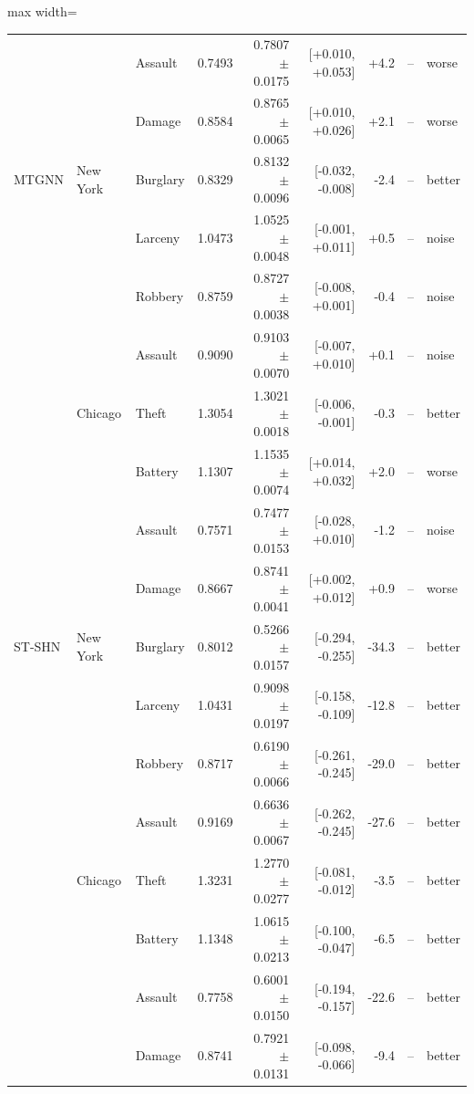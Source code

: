 \begin{table}[H]
\begin{adjustbox}{max width=\linewidth}
\begin{tabular}{lllrrrrrl}
 &  & Assault & 0.7493 & 0.7807 $\pm$ 0.0175 & [+0.010, +0.053] & +4.2 & -- & worse \\
 &  & Damage & 0.8584 & 0.8765 $\pm$ 0.0065 & [+0.010, +0.026] & +2.1 & -- & worse \\
\midrule
MTGNN & New York & Burglary & 0.8329 & 0.8132 $\pm$ 0.0096 & [-0.032, -0.008] & -2.4 & -- & better \\
 &  & Larceny & 1.0473 & 1.0525 $\pm$ 0.0048 & [-0.001, +0.011] & +0.5 & -- & noise \\
 &  & Robbery & 0.8759 & 0.8727 $\pm$ 0.0038 & [-0.008, +0.001] & -0.4 & -- & noise \\
 &  & Assault & 0.9090 & 0.9103 $\pm$ 0.0070 & [-0.007, +0.010] & +0.1 & -- & noise \\
 & Chicago & Theft & 1.3054 & 1.3021 $\pm$ 0.0018 & [-0.006, -0.001] & -0.3 & -- & better \\
 &  & Battery & 1.1307 & 1.1535 $\pm$ 0.0074 & [+0.014, +0.032] & +2.0 & -- & worse \\
 &  & Assault & 0.7571 & 0.7477 $\pm$ 0.0153 & [-0.028, +0.010] & -1.2 & -- & noise \\
 &  & Damage & 0.8667 & 0.8741 $\pm$ 0.0041 & [+0.002, +0.012] & +0.9 & -- & worse \\
\midrule
ST-SHN & New York & Burglary & 0.8012 & 0.5266 $\pm$ 0.0157 & [-0.294, -0.255] & -34.3 & -- & better \\
 &  & Larceny & 1.0431 & 0.9098 $\pm$ 0.0197 & [-0.158, -0.109] & -12.8 & -- & better \\
 &  & Robbery & 0.8717 & 0.6190 $\pm$ 0.0066 & [-0.261, -0.245] & -29.0 & -- & better \\
 &  & Assault & 0.9169 & 0.6636 $\pm$ 0.0067 & [-0.262, -0.245] & -27.6 & -- & better \\
 & Chicago & Theft & 1.3231 & 1.2770 $\pm$ 0.0277 & [-0.081, -0.012] & -3.5 & -- & better \\
 &  & Battery & 1.1348 & 1.0615 $\pm$ 0.0213 & [-0.100, -0.047] & -6.5 & -- & better \\
 &  & Assault & 0.7758 & 0.6001 $\pm$ 0.0150 & [-0.194, -0.157] & -22.6 & -- & better \\
 &  & Damage & 0.8741 & 0.7921 $\pm$ 0.0131 & [-0.098, -0.066] & -9.4 & -- & better \\
\bottomrule\end{tabular}\end{adjustbox}\end{table}
